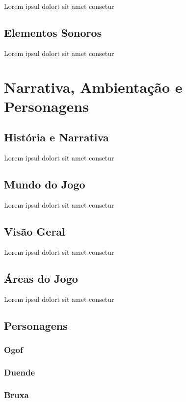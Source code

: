 Lorem ipsul dolort sit amet consetur

\section{Elementos Sonoros}

Lorem ipsul dolort sit amet consetur

\chapter{Narrativa, Ambientação e Personagens}

\section{História e Narrativa}

Lorem ipsul dolort sit amet consetur

\section{Mundo do Jogo}

Lorem ipsul dolort sit amet consetur


\section{Visão Geral}

Lorem ipsul dolort sit amet consetur

\section{Áreas do Jogo}

Lorem ipsul dolort sit amet consetur


\section{Personagens}

\subsection{Ogof}
\subsection{Duende}
\subsection{Bruxa}
